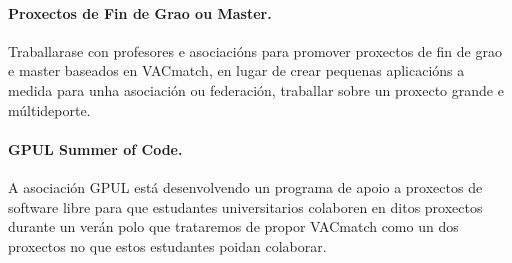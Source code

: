     \paragraph{Proxectos de Fin de Grao ou Master.} Traballarase con profesores 
e asociacións para promover proxectos de fin de grao e master baseados en 
VACmatch, en lugar de crear pequenas aplicacións a medida para unha asociación 
ou federación, traballar sobre un proxecto grande e múltideporte.

    \paragraph{GPUL Summer of Code.} A asociación GPUL está desenvolvendo un 
programa de apoio a proxectos de software libre para que estudantes 
universitarios colaboren en ditos proxectos durante un verán polo que trataremos 
de propor VACmatch como un dos proxectos no que estos estudantes poidan 
colaborar.


